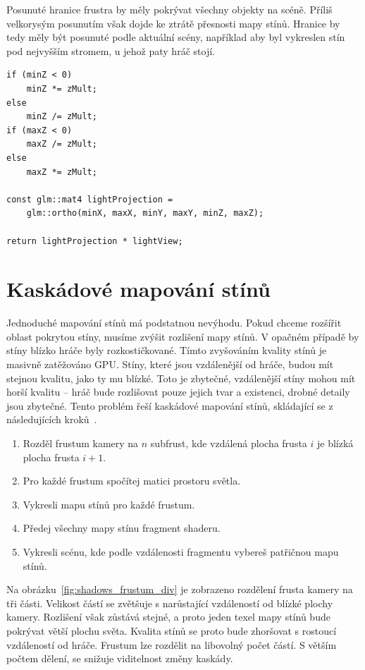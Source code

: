 \documentclass[thesis=M,czech]{FITthesis}[2019/12/23]
\begin{document}
Posunuté hranice frustra by měly pokrývat všechny objekty na scéně. Příliš velkorysým posunutím však dojde ke ztrátě přesnosti mapy stínů. Hranice by tedy měly být posunuté podle aktuální scény, například aby byl vykreslen stín pod nejvyšším stromem, u jehož paty hráč stojí.

\begin{verbatim}
if (minZ < 0) 
    minZ *= zMult;
else 
    minZ /= zMult;
if (maxZ < 0) 
    maxZ /= zMult;
else 
    maxZ *= zMult;

const glm::mat4 lightProjection = 
    glm::ortho(minX, maxX, minY, maxY, minZ, maxZ);

return lightProjection * lightView;
\end{verbatim}

\section{Kaskádové mapování stínů}

Jednoduché mapování stínů má podstatnou nevýhodu. Pokud chceme rozšířit oblast pokrytou stíny, musíme zvýšit rozlišení mapy stínů. V opačném případě by stíny blízko hráče byly rozkostičkované. Tímto zvyšováním kvality stínů je masivně zatěžováno GPU. Stíny, které jsou vzdálenější od hráče, budou mít stejnou kvalitu, jako ty mu blízké. Toto je zbytečné, vzdálenější stíny mohou mít horší kvalitu -- hráč bude rozlišovat pouze jejich tvar a existenci, drobné detaily jsou zbytečné. Tento problém řeší kaskádové mapování stínů, skládající se z následujících kroků~\cite{lopgl_csm}.

\begin{enumerate}
\item Rozděl frustum kamery na $n$ subfrust, kde vzdálená plocha frusta $i$ je blízká plocha frusta $i + 1$.

\item Pro každé frustum spočítej matici prostoru světla.
\item Vykresli mapu stínů pro každé frustum.
\item Předej všechny mapy stínu fragment shaderu.
\item Vykresli scénu, kde podle vzdálenosti fragmentu vybereš patřičnou mapu stínů.
\end{enumerate}

Na obrázku~\ref{fig:shadows_frustum_div} je zobrazeno rozdělení frusta kamery na tři části. Velikost částí se zvětšuje s narůstající vzdáleností od blízké plochy kamery. Rozlišení však zůstává stejné, a proto jeden texel mapy stínů bude pokrývat větší plochu světa. Kvalita stínů se proto bude zhoršovat s rostoucí vzdáleností od hráče. Frustum lze rozdělit na libovolný počet částí. S větším počtem dělení, se snižuje viditelnost změny kaskády.
\end{document}
